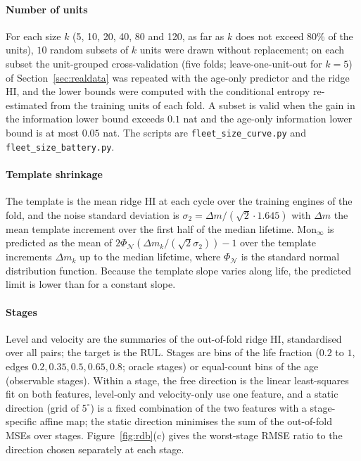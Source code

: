 \documentclass[preprint,12pt]{elsarticle}
\theoremstyle{definition}
\begin{document}
\paragraph{Number of units} For each size $k$ (5, 10, 20, 40, 80 and 120, as far as $k$ does not exceed $80\%$ of the units), $10$ random subsets of $k$ units were drawn without replacement; on each subset the unit-grouped cross-validation (five folds; leave-one-unit-out for $k=5$) of Section~\ref{sec:realdata} was repeated with the age-only predictor and the ridge HI, and the lower bounds were computed with the conditional entropy re-estimated from the training units of each fold. A subset is valid when the gain in the information lower bound exceeds $0.1$ nat and the age-only information lower bound is at most $0.05$ nat. The scripts are \texttt{fleet\_size\_curve.py} and \texttt{fleet\_size\_battery.py}.

\paragraph{Template shrinkage} The template is the mean ridge HI at each cycle over the training engines of the fold, and the noise standard deviation is $\sigma_2=\Delta m/(\sqrt2\cdot1.645)$ with $\Delta m$ the mean template increment over the first half of the median lifetime. $\mathrm{Mon}_\infty$ is predicted as the mean of $2\Phi_{\mathcal N}(\Delta m_k/(\sqrt2\sigma_2))-1$ over the template increments $\Delta m_k$ up to the median lifetime, where $\Phi_{\mathcal N}$ is the standard normal distribution function. Because the template slope varies along life, the predicted limit is lower than for a constant slope.

\paragraph{Stages} Level and velocity are the summaries of the out-of-fold ridge HI, standardised over all pairs; the target is the RUL. Stages are bins of the life fraction ($0.2$ to $1$, edges $0.2,0.35,0.5,0.65,0.8$; oracle stages) or equal-count bins of the age (observable stages). Within a stage, the free direction is the linear least-squares fit on both features, level-only and velocity-only use one feature, and a static direction (grid of $5^\circ$) is a fixed combination of the two features with a stage-specific affine map; the static direction minimises the sum of the out-of-fold MSEs over stages. Figure~\ref{fig:rdb}(c) gives the worst-stage RMSE ratio to the direction chosen separately at each stage.
\end{document}
